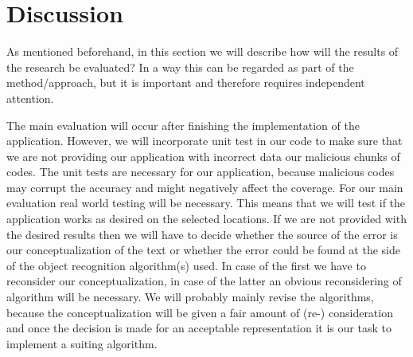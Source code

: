 \documentclass[12pt ]{article}
\begin{document}
\section{Discussion}\label{evaluation}
As mentioned beforehand, in this section we will describe how will the results of the research be evaluated? In a way this can be regarded as part of the method/approach, but it is important and therefore requires independent attention. 

The main evaluation will occur after finishing the implementation of the application. However, we will incorporate unit test in our code to make sure that we are not providing our application with incorrect data our malicious chunks of codes. The unit tests are necessary for our application, because malicious codes may corrupt the accuracy and might negatively affect the coverage.
	For our main evaluation real world testing will be necessary. This means that we will test if the application works as desired on the selected locations. If we are not provided with the desired results then we will have to decide whether the source of the error is our conceptualization of the text or whether the error could be found at the side of the object recognition algorithm(s) used. In case of the first we have to reconsider our conceptualization, in case of the latter an obvious reconsidering of algorithm will be necessary. We will probably mainly revise the algorithms, because the conceptualization will be given a fair amount of (re-) consideration and once the decision is made for an acceptable representation it is our task to implement a suiting algorithm.
\newpage

\end{document}
